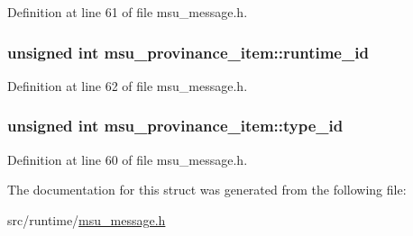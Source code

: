 Definition at line 61 of file msu\-\_\-message.\-h.

\hypertarget{structmsu__provinance__item_a03aec79bc90a021ad1d4ef1d2c3296e3}{
\subsubsection[{runtime\-\_\-id}]{\setlength{\rightskip}{0pt plus 5cm}unsigned int msu\-\_\-provinance\-\_\-item\-::runtime\-\_\-id}}\label{structmsu__provinance__item_a03aec79bc90a021ad1d4ef1d2c3296e3}


Definition at line 62 of file msu\-\_\-message.\-h.

\hypertarget{structmsu__provinance__item_a87a273f0d05488e4421a712399b17b8d}{
\subsubsection[{type\-\_\-id}]{\setlength{\rightskip}{0pt plus 5cm}unsigned int msu\-\_\-provinance\-\_\-item\-::type\-\_\-id}}\label{structmsu__provinance__item_a87a273f0d05488e4421a712399b17b8d}


Definition at line 60 of file msu\-\_\-message.\-h.



The documentation for this struct was generated from the following file\-:\begin{DoxyCompactItemize}
\item 
src/runtime/\hyperlink{msu__message_8h}{msu\-\_\-message.\-h}\end{DoxyCompactItemize}
